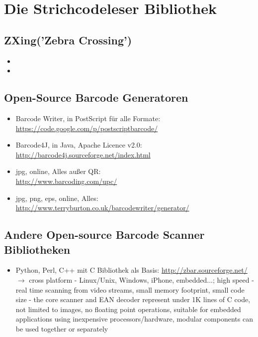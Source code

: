 \section{Die Strichcodeleser Bibliothek}

\subsection*{ZXing('Zebra Crossing')}
\begin{itemize}
	\item 
	\item 
\end{itemize}


\subsection*{Open-Source Barcode Generatoren}
\begin{itemize}
	\item Barcode Writer, in PostScript für alle Formate:\\ \url{https://code.google.com/p/postscriptbarcode/}
	\item Barcode4J, in Java, Apache Licence v2.0:\\ \url{http://barcode4j.sourceforge.net/index.html}
	\item jpg, online, Alles außer QR:\\ \url{http://www.barcoding.com/upc/}
	\item jpg, png, eps, online, Alles:\\ \url{http://www.terryburton.co.uk/barcodewriter/generator/}
\end{itemize}
 

\subsection*{Andere Open-source Barcode Scanner Bibliotheken}
\begin{itemize}
	\item Python, Perl, C++ mit C Bibliothek als Basis: \url{http://zbar.sourceforge.net/}\\
	$\to$ cross platform - Linux/Unix, Windows, iPhone, embedded...; high speed - real time scanning from video streams, small memory footprint, small code size - the core scanner and EAN decoder represent under 1K lines of C code, not limited to images, no floating point operations, suitable for embedded applications using inexpensive processors/hardware, modular components can be used together or separately
\end{itemize}
